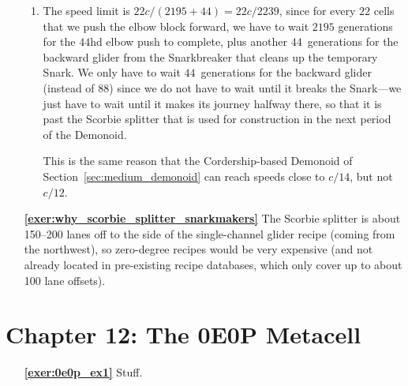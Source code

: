 \begin{multicols}{2}
\begin{itemize}[leftmargin=0em]
\begin{enumerate}[leftmargin=1.5em,label=\bf\color{ocre}(\alph*)]
			\item The speed limit is $22c/(2195+44) = 22c/2239$, since for every $22$ cells that we push the elbow block forward, we have to wait $2195$ generations for the $44$hd elbow push to complete, plus another $44$~generations for the backward glider from the Snarkbreaker that cleans up the temporary Snark. We only have to wait $44$~generations for the backward glider (instead of $88$) since we do not have to wait until it breaks the Snark---we just have to wait until it makes its journey halfway there, so that it is past the Scorbie splitter that is used for construction in the next period of the Demonoid.
			
			This is the same reason that the Cordership-based Demonoid of Section~\ref{sec:medium_demonoid} can reach speeds close to $c/14$, but not $c/12$.\\
		\end{enumerate}
		
		\item[\bf\color{ocre}\sffamily\ref{exer:why_scorbie_splitter_snarkmakers}] The Scorbie splitter is about 150--200 lanes off to the side of the single-channel glider recipe (coming from the northwest), so zero-degree recipes would be very expensive (and not already located in pre-existing recipe databases, which only cover up to about 100 lane offsets).\\
	\end{itemize}
\end{multicols}



\hypertarget{solutions_0e0p}{}\label{solutions_0e0p}
\section*{Chapter 12: The 0E0P Metacell}
\renewcommand{\chapterfolder}{0e0p/}

\begin{multicols}{2}
	\begin{itemize}[leftmargin=0em]
		\item[\bf\color{ocre}\sffamily\ref{exer:0e0p_ex1}] Stuff.
	\end{itemize}
\end{multicols}

\normalsize